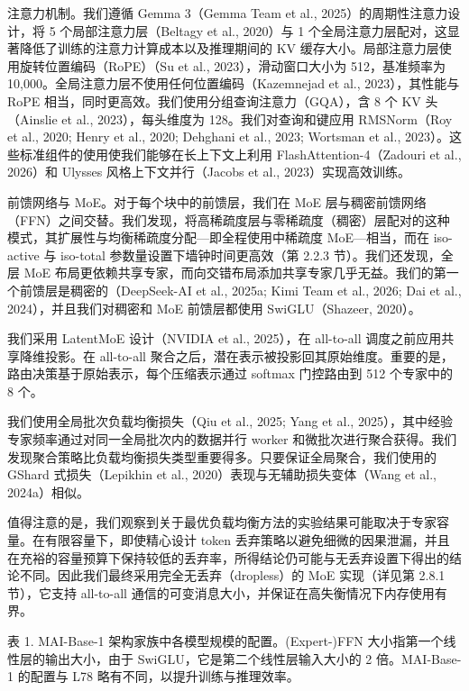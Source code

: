 注意力机制。我们遵循 Gemma 3（Gemma Team et al., 2025）的周期性注意力设计，将 5 个局部注意力层（Beltagy et al., 2020）与 1 个全局注意力层配对，这显著降低了训练的注意力计算成本以及推理期间的 KV 缓存大小。局部注意力层使用旋转位置编码（RoPE）（Su et al., 2023），滑动窗口大小为 512，基准频率为 10,000。全局注意力层不使用任何位置编码（Kazemnejad et al., 2023），其性能与 RoPE 相当，同时更高效。我们使用分组查询注意力（GQA），含 8 个 KV 头（Ainslie et al., 2023），每头维度为 128。我们对查询和键应用 RMSNorm（Roy et al., 2020; Henry et al., 2020; Dehghani et al., 2023; Wortsman et al., 2023）。这些标准组件的使用使我们能够在长上下文上利用 FlashAttention-4（Zadouri et al., 2026）和 Ulysses 风格上下文并行（Jacobs et al., 2023）实现高效训练。

前馈网络与 MoE。对于每个块中的前馈层，我们在 MoE 层与稠密前馈网络（FFN）之间交替。我们发现，将高稀疏度层与零稀疏度（稠密）层配对的这种模式，其扩展性与均衡稀疏度分配---即全程使用中稀疏度 MoE---相当，而在 iso-active 与 iso-total 参数量设置下墙钟时间更高效（第 2.2.3 节）。我们还发现，全层 MoE 布局更依赖共享专家，而向交错布局添加共享专家几乎无益。我们的第一个前馈层是稠密的（DeepSeek-AI et al., 2025a; Kimi Team et al., 2026; Dai et al., 2024），并且我们对稠密和 MoE 前馈层都使用 SwiGLU（Shazeer, 2020）。

我们采用 LatentMoE 设计（NVIDIA et al., 2025），在 all-to-all 调度之前应用共享降维投影。在 all-to-all 聚合之后，潜在表示被投影回其原始维度。重要的是，路由决策基于原始表示，每个压缩表示通过 softmax 门控路由到 512 个专家中的 8 个。

我们使用全局批次负载均衡损失（Qiu et al., 2025; Yang et al., 2025），其中经验专家频率通过对同一全局批次内的数据并行 worker 和微批次进行聚合获得。我们发现聚合策略比负载均衡损失类型重要得多。只要保证全局聚合，我们使用的 GShard 式损失（Lepikhin et al., 2020）表现与无辅助损失变体（Wang et al., 2024a）相似。

值得注意的是，我们观察到关于最优负载均衡方法的实验结果可能取决于专家容量。在有限容量下，即使精心设计 token 丢弃策略以避免细微的因果泄漏，并且在充裕的容量预算下保持较低的丢弃率，所得结论仍可能与无丢弃设置下得出的结论不同。因此我们最终采用完全无丢弃（dropless）的 MoE 实现（详见第 2.8.1 节），它支持 all-to-all 通信的可变消息大小，并保证在高失衡情况下内存使用有界。



表 1. MAI-Base-1 架构家族中各模型规模的配置。(Expert-)FFN 大小指第一个线性层的输出大小，由于 SwiGLU，它是第二个线性层输入大小的 2 倍。MAI-Base-1 的配置与 L78 略有不同，以提升训练与推理效率。


